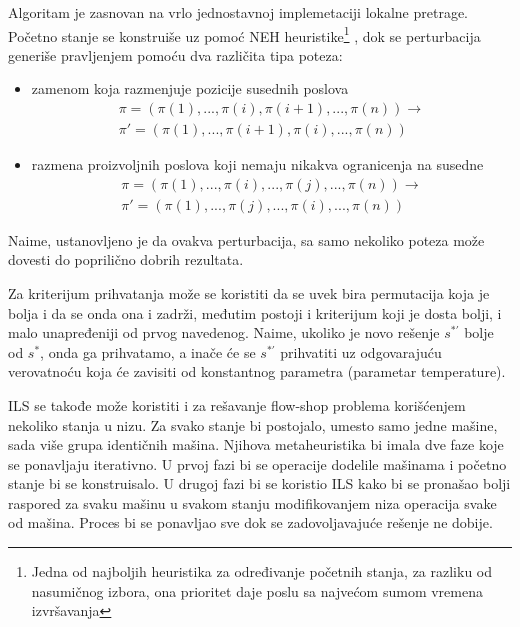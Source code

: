 \documentclass[a4paper]{article}
\newcommand{\sstar}[0]{$\textit{s}^*$}
\begin{document}
Algoritam je zasnovan na vrlo jednostavnoj implemetaciji lokalne pretrage. Početno stanje se konstruiše uz pomoć NEH heuristike\footnote{Jedna od najboljih heuristika za određivanje početnih stanja, za razliku od nasumičnog izbora, ona prioritet daje poslu sa najvećom sumom vremena izvršavanja }
, dok se perturbacija generiše pravljenjem pomoću dva različita tipa poteza:
\begin{itemize}
  \item zamenom koja razmenjuje pozicije susednih poslova \\
	\begin{gather*}
	 \pi = (\pi(1),..., \pi(i), \pi(i+1),..., \pi(n)) \rightarrow \\\pi\prime =  ( \pi(1),...,  \pi(i+1),  \pi(i),...,  \pi(n))
  \end{gather*}
  \item razmena proizvoljnih poslova koji nemaju nikakva ogranicenja na susedne \\
	\begin{gather*}
	 \pi = (\pi(1),..., \pi(i),..., \pi(j),..., \pi(n)) \rightarrow \\\pi\prime =  ( \pi(1),...,  \pi(j),...,  \pi(i),...,  \pi(n))
	\end{gather*}
\end{itemize}
Naime, ustanovljeno je da ovakva perturbacija, sa samo nekoliko poteza može dovesti do poprilično dobrih rezultata.


Za kriterijum prihvatanja može se koristiti da se uvek bira permutacija koja je bolja i da se onda ona i zadrži, međutim postoji i kriterijum koji je dosta bolji, i malo unapređeniji od prvog navedenog. Naime, ukoliko je novo rešenje $\textit{s}^{*\prime}$ bolje od \sstar{}, onda ga prihvatamo, a inače će se $\textit{s}^{*\prime}$ prihvatiti uz odgovarajuću verovatnoću
koja će zavisiti od konstantnog parametra  (parametar temperature).

ILS se takođe može koristiti i za rešavanje flow-shop problema korišćenjem nekoliko stanja u nizu. Za svako stanje bi postojalo, umesto samo jedne mašine, sada više grupa identičnih mašina. Njihova metaheuristika bi imala dve faze koje se ponavljaju iterativno. U prvoj fazi bi se operacije dodelile mašinama i početno stanje bi se konstruisalo. U drugoj fazi bi se koristio ILS kako bi se pronašao bolji raspored za svaku mašinu u svakom stanju modifikovanjem niza operacija svake od mašina. Proces bi se ponavljao sve dok se zadovoljavajuće rešenje ne dobije. \cite{applyingIteratedLocalSearchtothePermutation} 
\end{document}
